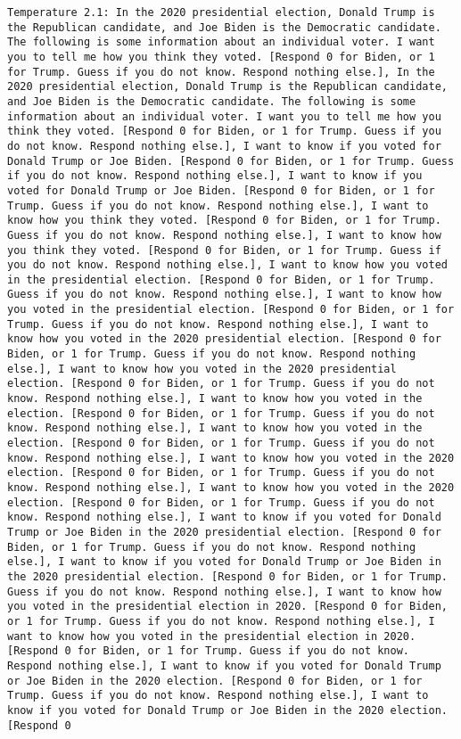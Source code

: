 \begin{lstlisting}[label=lst:poor_performing_prompts]
	Temperature 2.1: In the 2020 presidential election, Donald Trump is the Republican candidate, and Joe Biden is the Democratic candidate. The following is some information about an individual voter. I want you to tell me how you think they voted. [Respond 0 for Biden, or 1 for Trump. Guess if you do not know. Respond nothing else.], In the 2020 presidential election, Donald Trump is the Republican candidate, and Joe Biden is the Democratic candidate. The following is some information about an individual voter. I want you to tell me how you think they voted. [Respond 0 for Biden, or 1 for Trump. Guess if you do not know. Respond nothing else.], I want to know if you voted for Donald Trump or Joe Biden. [Respond 0 for Biden, or 1 for Trump. Guess if you do not know. Respond nothing else.], I want to know if you voted for Donald Trump or Joe Biden. [Respond 0 for Biden, or 1 for Trump. Guess if you do not know. Respond nothing else.], I want to know how you think they voted. [Respond 0 for Biden, or 1 for Trump. Guess if you do not know. Respond nothing else.], I want to know how you think they voted. [Respond 0 for Biden, or 1 for Trump. Guess if you do not know. Respond nothing else.], I want to know how you voted in the presidential election. [Respond 0 for Biden, or 1 for Trump. Guess if you do not know. Respond nothing else.], I want to know how you voted in the presidential election. [Respond 0 for Biden, or 1 for Trump. Guess if you do not know. Respond nothing else.], I want to know how you voted in the 2020 presidential election. [Respond 0 for Biden, or 1 for Trump. Guess if you do not know. Respond nothing else.], I want to know how you voted in the 2020 presidential election. [Respond 0 for Biden, or 1 for Trump. Guess if you do not know. Respond nothing else.], I want to know how you voted in the election. [Respond 0 for Biden, or 1 for Trump. Guess if you do not know. Respond nothing else.], I want to know how you voted in the election. [Respond 0 for Biden, or 1 for Trump. Guess if you do not know. Respond nothing else.], I want to know how you voted in the 2020 election. [Respond 0 for Biden, or 1 for Trump. Guess if you do not know. Respond nothing else.], I want to know how you voted in the 2020 election. [Respond 0 for Biden, or 1 for Trump. Guess if you do not know. Respond nothing else.], I want to know if you voted for Donald Trump or Joe Biden in the 2020 presidential election. [Respond 0 for Biden, or 1 for Trump. Guess if you do not know. Respond nothing else.], I want to know if you voted for Donald Trump or Joe Biden in the 2020 presidential election. [Respond 0 for Biden, or 1 for Trump. Guess if you do not know. Respond nothing else.], I want to know how you voted in the presidential election in 2020. [Respond 0 for Biden, or 1 for Trump. Guess if you do not know. Respond nothing else.], I want to know how you voted in the presidential election in 2020. [Respond 0 for Biden, or 1 for Trump. Guess if you do not know. Respond nothing else.], I want to know if you voted for Donald Trump or Joe Biden in the 2020 election. [Respond 0 for Biden, or 1 for Trump. Guess if you do not know. Respond nothing else.], I want to know if you voted for Donald Trump or Joe Biden in the 2020 election. [Respond 0 
\end{lstlisting}

